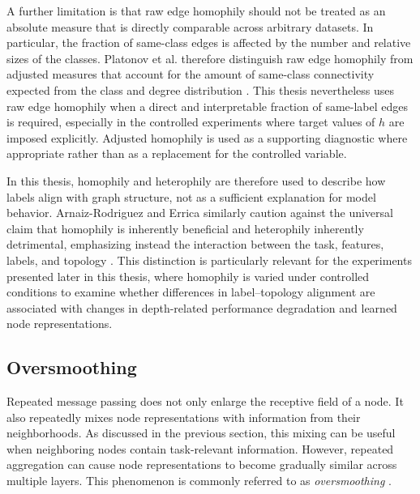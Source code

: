 \documentclass[english]{lni}
\begin{document}
A further limitation is that raw edge homophily should not be treated as an absolute measure that is directly comparable across arbitrary datasets. In particular, the fraction of same-class edges is affected by the number and relative sizes of the classes. Platonov et al. therefore distinguish raw edge homophily from adjusted measures that account for the amount of same-class connectivity expected from the class and degree distribution \cite{platonov2023critical}. This thesis nevertheless uses raw edge homophily when a direct and interpretable fraction of same-label edges is required, especially in the controlled experiments where target values of $h$ are imposed explicitly. Adjusted homophily is used as a supporting diagnostic where appropriate rather than as a replacement for the controlled variable. 

In this thesis, homophily and heterophily are therefore used to describe how labels align with graph structure, not as a sufficient explanation for model behavior. Arnaiz-Rodriguez and Errica similarly caution against the universal claim that homophily is inherently beneficial and heterophily inherently detrimental, emphasizing instead the interaction between the task, features, labels, and topology \cite{arnaiz2026demystifying}. This distinction is particularly relevant for the experiments presented later in this thesis, where homophily is varied under controlled conditions to examine whether differences in label–topology alignment are associated with changes in depth-related performance degradation and learned node representations.


\subsection{Oversmoothing}
\label{sec:oversmoothing-background}

Repeated message passing does not only enlarge the receptive field of a node. It also repeatedly mixes node representations with information from their neighborhoods. As discussed in the previous section, this mixing can be useful when neighboring nodes contain task-relevant information.
However, repeated aggregation can cause node representations to become gradually similar across multiple layers.
This phenomenon is commonly referred to as \emph{oversmoothing} \cite{li2018oversmoothing,rusch2023oversmoothing}.
\end{document}
